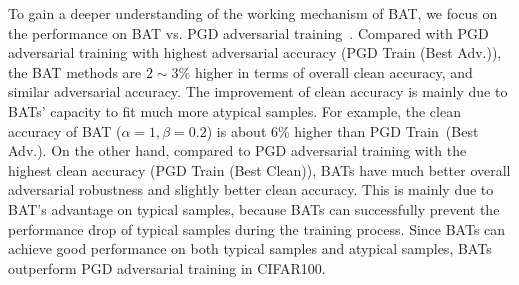 To gain a deeper understanding of the working mechanism of BAT, we focus on the performance on BAT vs. PGD adversarial training~\cite{madry2017towards}. Compared with PGD adversarial training with highest adversarial accuracy (PGD Train (Best Adv.)), the BAT methods are $2\sim3\%$ higher in terms of overall clean accuracy, and similar adversarial accuracy. The improvement of clean accuracy is mainly due to BATs' capacity to fit much more atypical samples. For example, the clean accuracy of BAT ($\alpha=1, \beta=0.2$) is about $6\%$ higher than PGD Train~(Best Adv.). On the other hand, compared to PGD adversarial training with the highest clean accuracy (PGD Train (Best Clean)), BATs have much better overall adversarial robustness and slightly better clean accuracy. This is mainly due to BAT's advantage on typical samples, because BATs can successfully prevent the performance drop of typical samples during the training process. Since BATs can achieve good performance on both typical samples and atypical samples, BATs outperform PGD adversarial training in CIFAR100.

